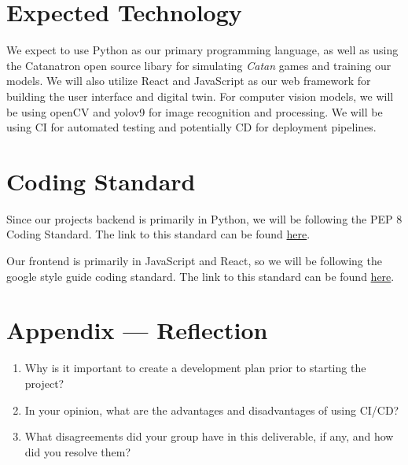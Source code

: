 \documentclass{article}
\begin{document}
\section{Expected Technology}

\raggedright
We expect to use Python as our primary programming 
language, as well as using the Catanatron open source 
libary for simulating \emph{Catan} games and training our models.
We will also utilize React and JavaScript as 
our web framework for building the user interface and 
digital twin. For computer vision models, we will be using
openCV and yolov9 for image recognition and processing. We will be using
CI for automated testing and potentially CD for deployment pipelines.


\section{Coding Standard}

Since our projects backend is primarily in Python, we will be following the PEP 8 Coding
Standard. The link to this standard can be found
\href{https://peps.python.org/pep-0008/}{here}.

\medskip

Our frontend is primarily in JavaScript and React, so we will be following the google style guide
coding standard. The link to this standard can be found \href{https://google.github.io/styleguide/jsguide.html}{here}.

\newpage{}

\section*{Appendix --- Reflection}

%

\begin{enumerate}
    \item Why is it important to create a development plan prior to starting the
    project?
    \item In your opinion, what are the advantages and disadvantages of using
    CI/CD?
    \item What disagreements did your group have in this deliverable, if any,
    and how did you resolve them?
\end{enumerate}
\end{document}
